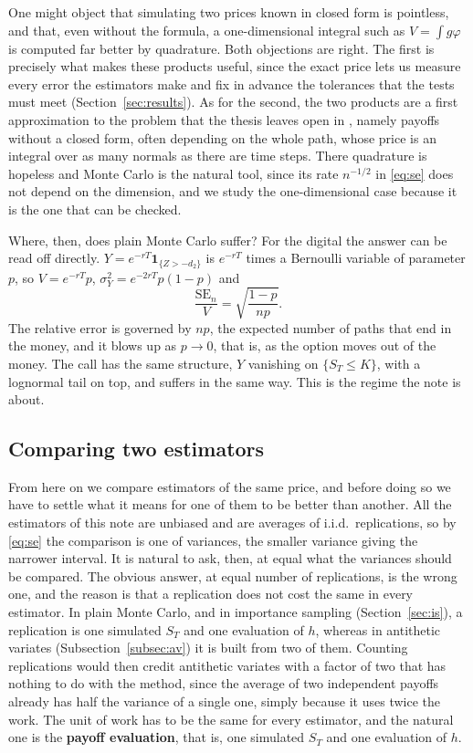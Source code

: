 \documentclass[11pt,a4paper]{article}
\theoremstyle{plain}
\theoremstyle{definition}
\theoremstyle{remark}
\newcommand{\1}{\mathbf{1}}
\begin{document}
One might object that simulating two prices known in closed form is pointless, and that, even without the formula, a one-dimensional integral such as $V = \int g\varphi$ is computed far better by quadrature. Both objections are right. The first is precisely what makes these products useful, since the exact price lets us measure every error the estimators make and fix in advance the tolerances that the tests must meet (Section~\ref{sec:results}). As for the second, the two products are a first approximation to the problem that the thesis leaves open in \cite[\S 6.3]{tfg}, namely payoffs without a closed form, often depending on the whole path, whose price is an integral over as many normals as there are time steps. There quadrature is hopeless and Monte Carlo is the natural tool, since its rate $n^{-1/2}$ in \eqref{eq:se} does not depend on the dimension, and we study the one-dimensional case because it is the one that can be checked.

Where, then, does plain Monte Carlo suffer? For the digital the answer can be read off directly. $Y = e^{-rT}\1_{\{Z > -d_2\}}$ is $e^{-rT}$ times a Bernoulli variable of parameter $p$, so $V = e^{-rT}p$, $\sigma_Y^2 = e^{-2rT}p(1-p)$ and
\begin{equation}\label{eq:rel-error}
  \frac{\mathrm{SE}_n}{V} = \sqrt{\frac{1 - p}{np}} .
\end{equation}
The relative error is governed by $np$, the expected number of paths that end in the money, and it blows up as $p \to 0$, that is, as the option moves out of the money. The call has the same structure, $Y$ vanishing on $\{S_T \le K\}$, with a lognormal tail on top, and suffers in the same way. This is the regime the note is about.

\subsection{Comparing two estimators}
\label{subsec:compare}

From here on we compare estimators of the same price, and before doing so we have to settle what it means for one of them to be better than another. All the estimators of this note are unbiased and are averages of i.i.d.\ replications, so by \eqref{eq:se} the comparison is one of variances, the smaller variance giving the narrower interval. It is natural to ask, then, at equal what the variances should be compared. The obvious answer, at equal number of replications, is the wrong one, and the reason is that a replication does not cost the same in every estimator. In plain Monte Carlo, and in importance sampling (Section~\ref{sec:is}), a replication is one simulated $S_T$ and one evaluation of $h$, whereas in antithetic variates (Subsection~\ref{subsec:av}) it is built from two of them. Counting replications would then credit antithetic variates with a factor of two that has nothing to do with the method, since the average of two independent payoffs already has half the variance of a single one, simply because it uses twice the work. The unit of work has to be the same for every estimator, and the natural one is the \textbf{payoff evaluation}, that is, one simulated $S_T$ and one evaluation of $h$.
\end{document}
